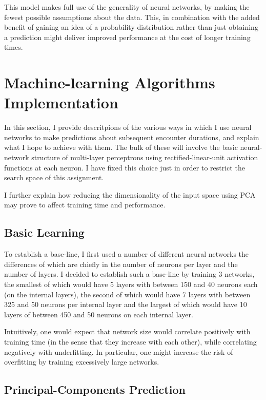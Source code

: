 \documentclass[10pt, twoside, a4paper]{article}
\begin{document}
	This model makes full use of the generality of neural networks, by making the fewest 
	possible assumptions about the data. This, in combination with the added benefit of 
	gaining an idea of a probability distribution rather than just obtaining a prediction 
	might deliver improved performance at the cost of longer training times.

	\section{Machine-learning Algorithms Implementation}
	In this section, I provide descritpions of the various ways in which I use neural networks 
	to make predictions about subsequent encounter durations, and explain what I hope to 
	achieve with them. The bulk of these will involve the basic neural-network structure of 
	multi-layer perceptrons using rectified-linear-unit activation functions at each neuron. I 
	have fixed this choice just in order to restrict the search space of this assignment. 

	I further explain how reducing the dimensionality of the input space using PCA may prove to
	affect training time and performance.

	\subsection{Basic Learning}

	To establish a base-line, I first used a number of different neural networks the 
	differences of which are chiefly in the number of neurons per layer and the number of 
	layers. I decided to establish such a base-line by training 3 networks, the smallest of 
	which would have 5 layers with between 150 and 40 neurons each (on the internal layers), 
	the second of which would have 7 layers with between 325 and 50 neurons per internal layer 
	and the largest of which would have 10 layers of between 450 and 50 neurons on each 
	internal layer.

	Intuitively, one would expect that network size would correlate positively with training 
	time (in the sense that they increase with each other), while correlating negatively with
	underfitting. In particular, one might increase the risk of overfitting by training 
	excessively large networks. 

	\subsection{Principal-Components Prediction}
\end{document}
